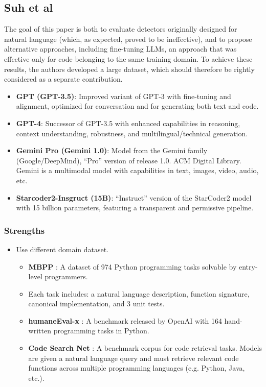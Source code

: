 \subsection{Suh et al}
The goal of this paper is both to evaluate detectors 
originally designed for natural language (which, as 
expected, proved to be ineffective), and to propose 
alternative approaches, including fine-tuning 
LLMs, an approach that was effective only for code 
belonging to the same training domain. To achieve 
these results, the authors developed a large dataset, 
which should therefore be rightly considered as a 
separate contribution.


\begin{itemize}
    \item \textbf{GPT (GPT-3.5)}: Improved variant of GPT-3 with 
    fine-tuning and alignment, optimized for conversation and for 
    generating both text and code.
    \item \textbf{GPT-4}: Successor of GPT-3.5 with enhanced 
    capabilities in reasoning, context understanding, robustness, 
    and multilingual/technical generation.
    \item \textbf{Gemini Pro (Gemini 1.0)}: Model from the Gemini 
    family (Google/DeepMind), “Pro” version of release 1.0. ACM Digital Library.
    Gemini is a multimodal model with capabilities in text, images, video, audio, etc.
    \item \textbf{Starcoder2-Insgruct (15B)}: “Instruct” version of the 
    StarCoder2 model with 15 billion parameters, 
    featuring a transparent and permissive pipeline.
\end{itemize}


\subsubsection*{Strengths}
\begin{itemize}
    \item Use different domain dataset.
    \begin{itemize}
        \item \textbf{MBPP} \cite{austin2021mbpp}: A dataset of 974 Python programming tasks solvable by entry-level programmers.
        \item Each task includes: a natural language description, function signature, canonical implementation, and 3 unit tests.
        \item \textbf{humaneEval-x} \cite{chen2021codex}: A benchmark released by OpenAI with 164 hand-written programming tasks in Python.
        \item \textbf{Code Search Net} \cite{codesearchnet2019}: A benchmark corpus 
        for code retrieval tasks. Models are given a natural language query and must retrieve relevant code functions across multiple programming languages (e.g. Python, Java, etc.).
    \end{itemize}
\end{itemize}


